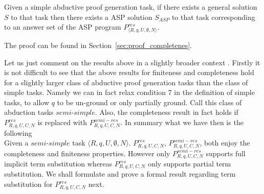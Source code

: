 
\begin{theorem}[Completeness]\label{thm:completeness}
  Given a simple abductive proof generation task, if there exists a general solution $S$ to that task then there
  exists a ASP solution $S_{ASP}$ to that task corresponding to an answer set of the ASP program $P_{\langle R,q,U,\emptyset,N\rangle}^{res}$.
\end{theorem}

The proof can be found in Section~\ref{sec:proof_completenes}.

Let us just comment on the results above in a slightly broader context . Firstly it is not difficult to see that the above results for finiteness and completeness hold for a slightly larger class of abductive proof generation tasks than the class of simple tasks. Namely we can in fact relax condition 7 in the definition of simple tasks, to allow $q$ to be un-ground or only partially ground. Call this class of abduction tasks $semi$-$simple$.  Also, the completeness result in fact holds if $P_{R,q,U,C,N}^{res}$ is replaced with $P_{R,q,U,C,N}^{semi-res}$. In summary what we have then is the following\\
Given a $\textit{semi-simple}$ task $\langle R,q,U,\emptyset,N\rangle$. $P_{R,q,U,C,N}^{res}$, $P_{R,q,U,C,N}^{semi-res}$, both enjoy the completeness and finiteness properties. However only $P_{R,q,U,C,N}^{semi-res}$ supports full implicit term substitution whereas $P_{R,q,U,C,N}^{res}$ only supports partial term substitution. We shall formulate and prove a formal result regarding term substitution for $P_{R,q,U,C,N}^{res}$ next.    

